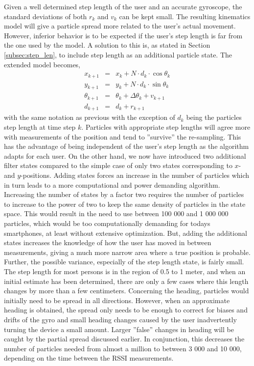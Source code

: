 \documentclass{LTHthesis}
\begin{document}
Given a well determined step length of the user and an accurate gyroscope, the standard deviations of both $r_k$ and $v_k$ can be kept small. The resulting kinematics model will give a particle spread more related to the user's actual movement. However, inferior behavior is to be expected if the user's step length is far from the one used by the model. A solution to this is, as stated in Section \ref{subsec:step_len}, to include step length as an additional particle state. The extended model becomes,
%
\begin{eqnarray}
x_{k+1} &  = & x_k + N\cdot d_k\cdot\cos{\theta_k} \nonumber\\
y_{k+1} & = &y_k + N\cdot d_k\cdot\sin{\theta_k}\label{eq:heading_step_len_kin_mod}\\
\theta_{k+1} & = & \theta_k +\Delta\theta_k+ v_{k+1} \nonumber \\
d_{k+1} & = & d_k + r_{k+1}\nonumber
\end{eqnarray}  
%
with the same notation as previous with the exception of $d_k$ being the particles step length at time step $k$. Particles with appropriate step lengths will agree more with measurements of the position and tend to ''survive'' the re-sampling. This has the advantage of being independent of the user's step length as the algorithm adapts for each user. On the other hand, we now have introduced two additional filter states compared to the simple case of only two states corresponding to $x$- and $y$-positions. Adding states forces an increase in the number of particles which in turn leads to a more computational and power demanding algorithm. Increasing the number of states by a factor two requires the number of particles to increase to the power of two to keep the same density of particles in the state space. This would result in the need to use between 100 000 and 1 000 000 particles, which would be too computationally demanding for todays smartphones, at least without extensive optimization. But, adding the additional states increases the knowledge of how the user has moved in between measurements, giving a much more narrow area where a true position is probable. Further, the possible variance, especially of the step length state, is fairly small. The step length for most persons is in the region of 0.5 to 1 meter, and when an initial estimate has been determined, there are only a few cases where this length changes by more than a few centimeters. Concerning the heading, particles would initially need to be spread in all directions. However, when an approximate heading is obtained, the spread only needs to be enough to correct for biases and drifts of the gyro and small heading changes caused by the user inadvertently turning the device a small amount. Larger ''false'' changes in heading will be caught by the partial spread discussed earlier. In conjunction, this decreases the number of particles needed from almost a million to between 3 000 and 10 000, depending on the time between the RSSI measurements.       
%
\end{document}
